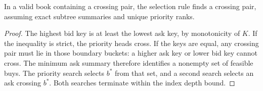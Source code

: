 \begin{proposition}
In a valid book containing a crossing pair, the selection rule finds a crossing pair,
assuming exact subtree summaries and unique priority ranks.
\end{proposition}
\begin{proof}
The highest bid key is at least the lowest ask key, by monotonicity of $K$.
If the inequality is strict, the priority heads cross. If the keys are equal, any crossing
pair must lie in those boundary buckets: a higher ask key or lower bid key cannot cross.
The minimum ask summary therefore identifies a nonempty set of feasible buys. The
priority search selects $b^*$ from that set, and a second search selects an ask crossing
$b^*$. Both searches terminate within the index depth bound.
\end{proof}
